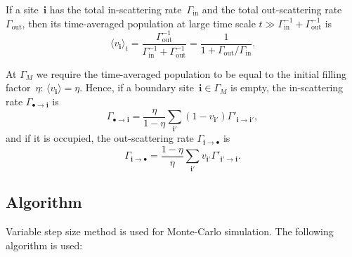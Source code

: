 \documentclass[10pt]{article}
\renewcommand{\vec}[1]{\mathbf{#1}}
\newcommand{\vi}{\vec{i}}
\begin{document}
If a site~$\vi$ has the total in-scattering rate~$\Gamma_{\mathrm{in}}$
and the total out-scattering rate $\Gamma_{\mathrm{out}}$, then its
time-averaged population at large time scale
$t \gg \Gamma_{\mathrm{in}}^{-1} + \Gamma_{\mathrm{out}}^{-1}$ is
\begin{equation}
	\langle v_\vi \rangle_t = \frac{\Gamma_{\mathrm{out}}^{-1}}%
	{\Gamma_{\mathrm{in}}^{-1} + \Gamma_{\mathrm{out}}^{-1}} =
	\frac{1}{1 + \Gamma_{\mathrm{out}} / \Gamma_{\mathrm{in}}}.
\end{equation}

At $\Gamma_M$ we require the time-averaged population to be equal to the initial
filling factor~$\eta$: $\langle v_\vi \rangle = \eta$. Hence, if a boundary
site~$\vi \in \Gamma_M$ is empty, the in-scattering rate $\Gamma_{\bullet \to \vi}$
is
\begin{equation}
	\Gamma_{\bullet \to \vi} =
		\frac{\eta}{1 - \eta} \sum_{\vi'} (1 - v_{\vi'}) \Gamma'_{\vi \to \vi'},
\end{equation}
and if it is occupied, the out-scattering rate $\Gamma_{\vi \to \bullet}$ is
\begin{equation}
	\Gamma_{\vi \to \bullet} =
		\frac{1 - \eta}{\eta} \sum_{\vi'} v_{\vi'} \Gamma'_{\vi' \to \vi}.
\end{equation}

\subsection{Algorithm}

Variable step size method is used for Monte-Carlo simulation. The following
algorithm is used:
\end{document}

